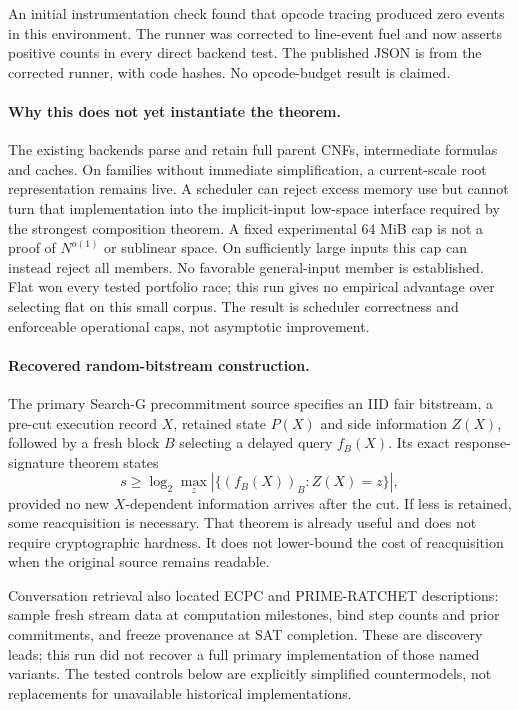 \documentclass[11pt]{article}
\begin{document}
An initial instrumentation check found that opcode tracing produced zero events
in this environment. The runner was corrected to line-event fuel and now asserts
positive counts in every direct backend test. The published JSON is from the
corrected runner, with code hashes. No opcode-budget result is claimed.

\paragraph{Why this does not yet instantiate the theorem.}
The existing backends parse and retain full parent CNFs, intermediate formulas
and caches. On families without immediate simplification, a current-scale root
representation remains live. A scheduler can reject excess memory use but cannot
turn that implementation into the implicit-input low-space interface required
by the strongest composition theorem. A fixed experimental 64 MiB cap is not a
proof of $N^{o(1)}$ or sublinear space. On sufficiently large inputs this cap
can instead reject all members. No favorable general-input member is established.
Flat won every tested portfolio race; this run gives no empirical advantage
over selecting flat on this small corpus. The result is scheduler correctness
and enforceable operational caps, not asymptotic improvement.

\paragraph{Recovered random-bitstream construction.}
The primary Search-G precommitment source specifies an IID fair bitstream,
a pre-cut execution record $X$, retained state $P(X)$ and side information
$Z(X)$, followed by a fresh block $B$ selecting a delayed query $f_B(X)$.
Its exact response-signature theorem states
\[
s\ge\log_2\max_z|\{(f_B(X))_B:Z(X)=z\}|,
\]
provided no new $X$-dependent information arrives after the cut. If less is
retained, some reacquisition is necessary. That theorem is already useful and
does not require cryptographic hardness. It does not lower-bound the cost of
reacquisition when the original source remains readable.

Conversation retrieval also located ECPC and PRIME-RATCHET descriptions:
sample fresh stream data at computation milestones, bind step counts and prior
commitments, and freeze provenance at SAT completion. These are discovery leads;
this run did not recover a full primary implementation of those named variants.
The tested controls below are explicitly simplified countermodels, not replacements
for unavailable historical implementations.
\end{document}
